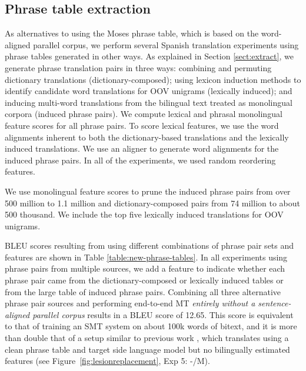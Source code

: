 \documentclass[11pt]{article}
\newcommand{\todopi}[2]{[\textcolor{red}{TODO for #1:} #2]}
\newcommand{\figref}[1]{Figure~\ref{#1}}
\begin{document}
\subsection{Phrase table extraction}\label{sect:exp:pt}
As alternatives to using the Moses phrase table, which is based on the word-aligned parallel corpus, we perform several Spanish translation experiments using phrase tables generated in other ways. As explained in Section \ref{sect:extract}, we generate phrase translation pairs in three ways: combining and permuting dictionary translations (dictionary-composed); using lexicon induction methods to identify candidate word translations for OOV unigrams (lexically induced); and inducing multi-word translations from the bilingual text treated as monolingual corpora (induced phrase pairs). We compute lexical and phrasal monolingual feature scores for all phrase pairs. To score lexical features, we use the word alignments inherent to both the dictionary-based translations and the lexically induced translations. We use an aligner \cite{DeNero07} to generate word alignments for the induced phrase pairs. In all of the experiments, we used random reordering features.

We use monolingual feature scores to prune the induced phrase pairs from over 500 million to 1.1 million and dictionary-composed pairs from 74 million to about 500 thousand. We include the top five lexically induced translations for OOV unigrams.

BLEU scores resulting from using different combinations of phrase pair sets and features are shown in Table \ref{table:new-phrase-tables}. In all experiments using phrase pairs from multiple sources, we add a feature to indicate whether each phrase pair came from the dictionary-composed or lexically induced tables or from the large table of induced phrase pairs.
Combining all three alternative phrase pair sources and performing end-to-end MT \emph{entirely without a sentence-aligned parallel corpus} results in a BLEU score of 12.65. This score is equivalent to that of training an SMT system on about 100k words of bitext, and it is more than double that of a setup similar to previous work \cite{Carbonell2006}, which translates
using a clean phrase table and target side language model but no bilingually estimated features (see \figref{fig:lesionreplacement}, Exp 5: -/M).
\end{document}
